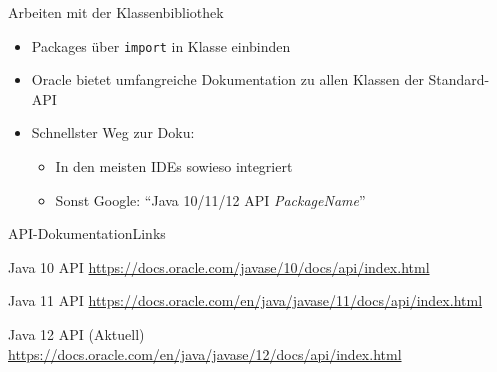 \begin{frame}{Arbeiten mit der Klassenbibliothek}
	\begin{itemize}
		\item Packages über \texttt{import} in Klasse einbinden
		\item Oracle bietet umfangreiche Dokumentation zu allen Klassen der Standard-API
		\item Schnellster Weg zur Doku:
		\begin{itemize}
			\item In den meisten IDEs sowieso integriert
			\item Sonst Google: "`Java 10/11/12 API \textit{PackageName}"'
		\end{itemize}
	\end{itemize}
\end{frame}

\begin{frame}{API-Dokumentation}{Links}
	\vfill
    \begin{block}{Java 10 API}
		\url{https://docs.oracle.com/javase/10/docs/api/index.html}
	\end{block}
	
    \begin{block}{Java 11 API}
		\url{https://docs.oracle.com/en/java/javase/11/docs/api/index.html}
	\end{block}
	
	\begin{block}{Java 12 API (Aktuell)}
		\url{https://docs.oracle.com/en/java/javase/12/docs/api/index.html}
	\end{block}
	
	
	\vfill
\end{frame}